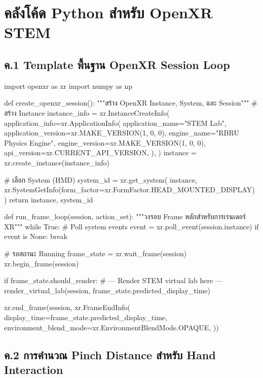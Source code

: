 \chapter{คลังโค้ด Python สำหรับ OpenXR STEM}
\label{app:C}

\section*{ค.1 Template พื้นฐาน OpenXR Session Loop}

\begin{codebox}
import openxr as xr
import numpy as np

def create_openxr_session():
    """สร้าง OpenXR Instance, System, และ Session"""
    # สร้าง Instance
    instance_info = xr.InstanceCreateInfo(
        application_info=xr.ApplicationInfo(
            application_name="STEM Lab",
            application_version=xr.MAKE_VERSION(1, 0, 0),
            engine_name="RBRU Physics Engine",
            engine_version=xr.MAKE_VERSION(1, 0, 0),
            api_version=xr.CURRENT_API_VERSION,
        ),
    )
    instance = xr.create_instance(instance_info)
    
    # เลือก System (HMD)
    system_id = xr.get_system(
        instance,
        xr.SystemGetInfo(form_factor=xr.FormFactor.HEAD_MOUNTED_DISPLAY)
    )
    return instance, system_id

def run_frame_loop(session, action_set):
    """วงรอบ Frame หลักสำหรับการเรนเดอร์ XR"""
    while True:
        # Poll system events
        event = xr.poll_event(session.instance)
        if event is None:
            break
        
        # รอสถานะ Running
        frame_state = xr.wait_frame(session)
        xr.begin_frame(session)
        
        if frame_state.should_render:
            # --- Render STEM virtual lab here ---
            render_virtual_lab(session, frame_state.predicted_display_time)
        
        xr.end_frame(session, xr.FrameEndInfo(
            display_time=frame_state.predicted_display_time,
            environment_blend_mode=xr.EnvironmentBlendMode.OPAQUE,
        ))
\end{codebox}

\section*{ค.2 การคำนวณ Pinch Distance สำหรับ Hand Interaction}

